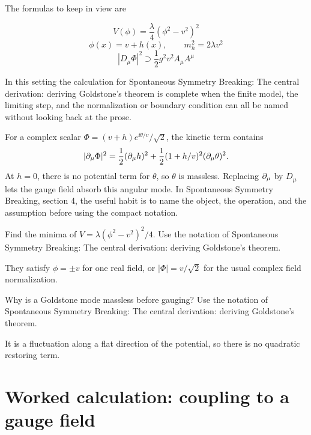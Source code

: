 The formulas to keep in view are

\[
  V(\phi)=\frac{\lambda}{4}(\phi^2-v^2)^2
\]
\[
  \phi(x)=v+h(x),\qquad m_h^2=2\lambda v^2
\]
\[
  |D_\mu\Phi|^2\supset \frac12g^2v^2A_\mu A^\mu
\]

In this setting the calculation for Spontaneous Symmetry Breaking: The central derivation: deriving Goldstone's theorem is complete when the finite model, the limiting step, and the normalization or boundary condition can all be named without looking back at the prose.




\begin{example}
For a complex scalar \(\Phi=(v+h)e^{\ii\theta/v}/\sqrt2\), the kinetic term contains
\[
  |\partial_\mu\Phi|^2=\frac12(\partial_\mu h)^2+\frac12(1+h/v)^2(\partial_\mu\theta)^2.
\]
At \(h=0\), there is no potential term for \(\theta\), so \(\theta\) is massless.  Replacing \(\partial_\mu\) by \(D_\mu\) lets the gauge field absorb this angular mode.  In Spontaneous Symmetry Breaking, section 4, the useful habit is to name the object, the operation, and the assumption before using the compact notation.
\end{example}



\begin{exercise}
Find the minima of \(V=\lambda(\phi^2-v^2)^2/4\).  Use the notation of Spontaneous Symmetry Breaking: The central derivation: deriving Goldstone's theorem.
\begin{answer}
They satisfy \(\phi=\pm v\) for one real field, or \(|\Phi|=v/\sqrt2\) for the usual complex field normalization.
\end{answer}
\end{exercise}

\begin{exercise}
Why is a Goldstone mode massless before gauging?  Use the notation of Spontaneous Symmetry Breaking: The central derivation: deriving Goldstone's theorem.
\begin{answer}
It is a fluctuation along a flat direction of the potential, so there is no quadratic restoring term.
\end{answer}
\end{exercise}



\section{Worked calculation: coupling to a gauge field}

